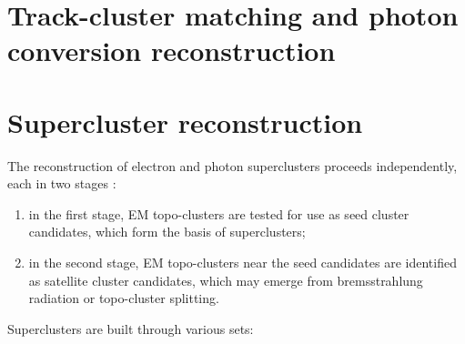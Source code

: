 \documentclass[a4paper, oneside]{book}
\begin{document}
		\section{Track-cluster matching and photon conversion reconstruction}
		
		\section{Supercluster reconstruction}
		The reconstruction of electron and photon superclusters proceeds independently, each in two stages \cite{El ph reco}:
		\begin{enumerate}
		\item in the first stage, EM topo-clusters are tested for use as seed cluster candidates, which form the basis of superclusters; 
		\item in the second stage, EM topo-clusters near the seed candidates are identified as satellite cluster candidates, which may emerge from bremsstrahlung radiation or topo-cluster splitting.
		\end{enumerate}
		Superclusters are built through various sets:
\end{document}
